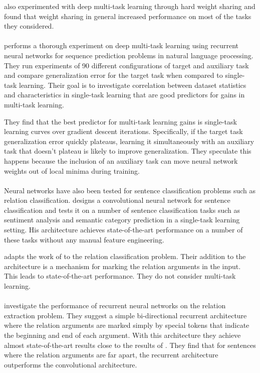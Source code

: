 \citet{collobert2011} also experimented with deep multi-task learning through hard weight sharing and found that weight sharing in general increased performance on most of the tasks they considered.
\\\\
\citet{bingel2017} performs a thorough experiment on deep multi-task learning using recurrent neural networks for sequence prediction problems in natural language processing. They run experiments of 90 different configurations of target and auxiliary task and compare generalization error for the target task when compared to single-task learning. Their goal is to investigate correlation between dataset statistics and characteristics in single-task learning that are good predictors for gains in multi-task learning.

They find that the best predictor for multi-task learning gains is single-task learning curves over gradient descent iterations. Specifically, if the target task generalization error quickly plateaus, learning it simultaneously with an auxiliary task that doesn't plateau is likely to improve generalization. They speculate this happens because the inclusion of an auxiliary task can move neural network weights out of local minima during training.
\\\\
Neural networks have also been tested for sentence classification problems such as relation classification. \citet{kim2014} designs a convolutional neural network for sentence classification and tests it on a number of sentence classification tasks such as sentiment analysis and semantic category prediction in a single-task learning setting. His architecture achieves state-of-the-art performance on a number of these tasks without any manual feature engineering.

\citet{nguyen2015} adapts the work of \citet{kim2014} to the relation classification problem. Their addition to the architecture is a mechanism for marking the relation arguments in the input. This leads to state-of-the-art performance. They do not consider multi-task learning.
\\\\
\citet{zhang2015} investigate the performance of recurrent neural networks on the relation extraction problem. They suggest a simple bi-directional recurrent architecture where the relation arguments are marked simply by special tokens that indicate the beginning and end of each argument. With this architecture they achieve almost state-of-the-art results close to the results of \citet{nguyen2015}. They find that for sentences where the relation arguments are far apart, the recurrent architecture outperforms the convolutional architecture.